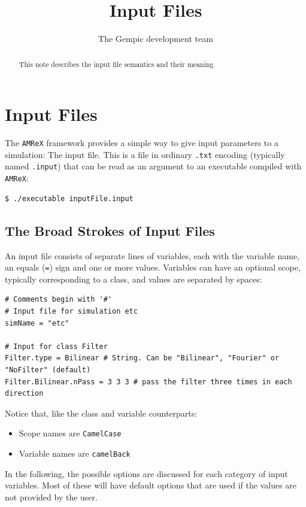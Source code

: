 \documentclass[11pt]{article}
\title{Input Files}
\author[1]{The Gempic development team}
\affil[1]{Max-Planck-Institut f\"ur Plasmaphysik, Garching, Germany}
\newcommand{\amrex}{\texttt{AMReX}}
\begin{document}
\maketitle

\begin{abstract}
This note describes the input file semantics and their meaning
\end{abstract}

\tableofcontents

\section{Input Files}
The \amrex{} framework provides a simple way to give input parameters to a simulation: The input file. This is a file in ordinary \verb|.txt| encoding (typically named \verb|.input|) that can be read as an argument to an executable compiled with \amrex:
\begin{lstlisting}[language=sh]
    $ ./executable inputFile.input 
\end{lstlisting}

\subsection{The Broad Strokes of Input Files}
An input file consists of separate lines of variables, each with the variable name, an equals (\verb|=|) sign and one or more values. Variables can have an optional scope, typically corresponding to a class, and values are separated by spaces:
\begin{lstlisting}[language=pkgconfig]
# Comments begin with '#'
# Input file for simulation etc
simName = "etc"

# Input for class Filter
Filter.type = Bilinear # String. Can be "Bilinear", "Fourier" or "NoFilter" (default)
Filter.Bilinear.nPass = 3 3 3 # pass the filter three times in each direction
\end{lstlisting}
%
Notice that, like the class and variable counterparts:
\begin{itemize}
     \item Scope names are \verb|CamelCase|
     \item Variable names are \verb|camelBack|
\end{itemize}
%
In the following, the possible options are discussed for each category of input variables. Most of these will have default options that are used if the values are not provided by the user.
\end{document}

